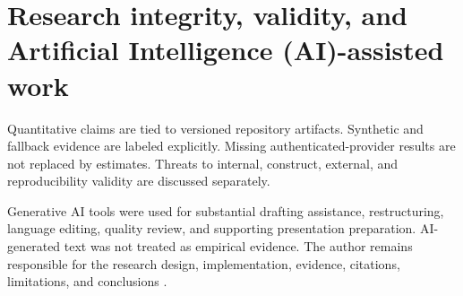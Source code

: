 \section{Research integrity, validity, and Artificial Intelligence (AI)-assisted work}

Quantitative claims are tied to versioned repository artifacts. Synthetic and fallback evidence are labeled explicitly. Missing authenticated-provider results are not replaced by estimates. Threats to internal, construct, external, and reproducibility validity are discussed separately.

Generative AI tools were used for substantial drafting assistance, restructuring, language editing, quality review, and supporting presentation preparation. AI-generated text was not treated as empirical evidence. The author remains responsible for the research design, implementation, evidence, citations, limitations, and conclusions \citep{copilot,uwasa-writing}.
